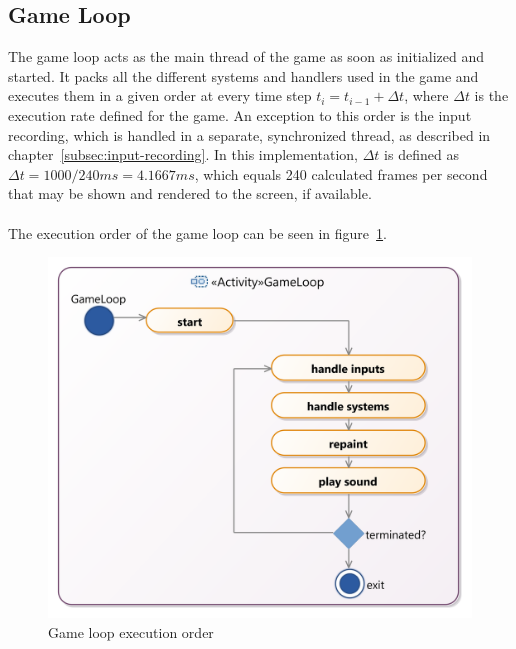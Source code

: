 \subsection{Game Loop}\label{subsec:game-loop}
The game loop acts as the main thread of the game as soon as initialized and started.
It packs all the different systems and handlers used in the game and executes them in a given order at every time step
$t_{i} = t_{i-1} + \Delta t$, where $\Delta t$ is the execution rate defined for the game.
An exception to this order is the input recording, which is handled in a separate, synchronized thread, as described in chapter~\ref{subsec:input-recording}.
In this implementation, $\Delta t$ is defined as $\Delta t = 1000 / 240 ms = 4.1667 ms$, which equals 240 calculated frames per second that may be shown and rendered
to the screen, if available.
\\ \\
The execution order of the game loop can be seen in figure~\ref{fig:gameloop-process}.
\begin{figure}
    \centering
    \includegraphics[width=\textwidth]{Pictures/res/implementation/gameloop-process}
    \caption{Game loop execution order}
    \label{fig:gameloop-process}
\end{figure}

